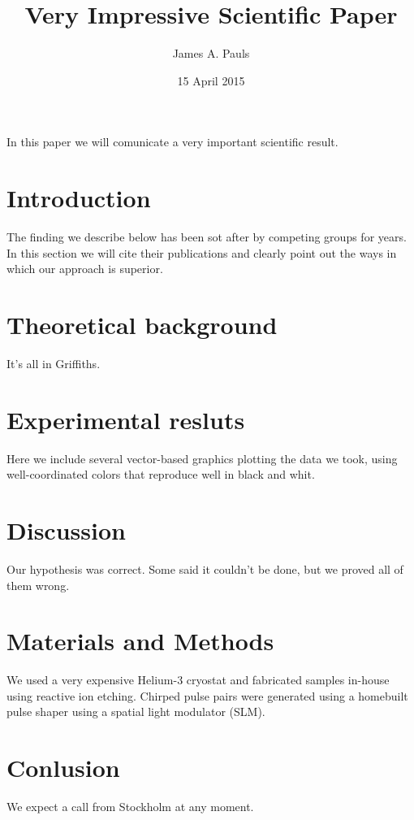 \documentclass[11pt]{amsart}
\title{Very Impressive Scientific Paper}
\author{James A. Pauls}
\date{15 April 2015}
\begin{document}
\maketitle

In this paper we will comunicate a very important scientific result.

\section{Introduction}

The finding we describe below has been sot after by competing groups
for years. In this section we will cite their publications and clearly
point out the ways in which our approach is superior.

\section{Theoretical background}

It's all in Griffiths.

\section{Experimental resluts}

Here we include several vector-based graphics plotting the data we
took, using well-coordinated colors that reproduce well in black and
whit.

\section{Discussion}

Our hypothesis was correct. Some said it couldn't be done, but we
proved all of them wrong.

\section{Materials and Methods}

We used a very expensive Helium-3 cryostat and fabricated samples
in-house using reactive ion etching. Chirped pulse pairs were
generated using a homebuilt pulse shaper using a spatial light
modulator (SLM).

\section{Conlusion}

We expect a call from Stockholm at any moment.
\end{document}
